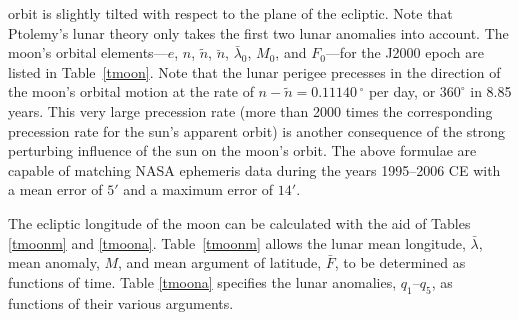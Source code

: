 orbit is slightly tilted with respect to the plane of the ecliptic.
Note that Ptolemy's lunar theory only takes the first two
lunar anomalies into account. 
The moon's orbital elements---$e$, $n$, $\tilde{n}$, $\breve{n}$, 
$\bar{\lambda}_0$, $M_0$, and $F_0$---for the J2000 epoch are listed in Table~\ref{tmoon}. Note that the lunar perigee precesses in the
direction of the moon's orbital motion at the rate of
$n-\tilde{n} = 0.11140\, ^\circ $ per day, or $360^\circ$ in 8.85 years. This
very large precession rate (more than 2000 times the corresponding
precession rate for the sun's apparent orbit) is another consequence of the strong
perturbing influence of the sun on the moon's orbit.
The above formulae are capable of matching NASA ephemeris
data during the years 1995--2006 CE with a mean error of $5'$  and
a maximum error of $14'$. 

The ecliptic longitude of the moon can be calculated with the aid of Tables \ref{tmoonm} and \ref{tmoona}.
Table~\ref{tmoonm} allows the lunar mean longitude, $\bar{\lambda}$,  mean anomaly, $M$, and  mean argument of latitude, $\bar{F}$, to be determined as functions of time.
Table \ref{tmoona} specifies the lunar anomalies, $q_1$--$q_5$, as functions of their various arguments.

